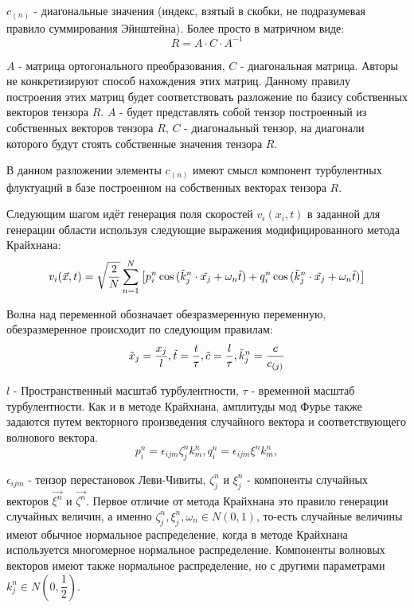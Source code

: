 $c_{\left( n \right)}$ - диагональные значения (индекс, взятый в скобки, не подразумевая правило суммирования Эйнштейна). Более просто в матричном виде:
\begin{equation}
  \label{eq:spectral_equation5}
    R = A \cdot C \cdot A ^ {-1}
\end{equation}

$A$ - матрица ортогонального преобразования, $C$ - диагональная матрица. Авторы не конкретизируют способ нахождения этих матриц. Данному правилу построения этих матриц будет соответствовать разложение по базису собственных векторов тензора $R$. $A$ - будет представлять собой тензор построенный из собственных векторов тензора $R$, $C$ - диагональный тензор, на диагонали которого будут стоять собственные значения тензора $R$. 

В данном разложении элементы $c_{\left( n \right)}$ имеют смысл компонент турбулентных флуктуаций в базе построенном на собственных векторах тензора $R$.

Следующим шагом идёт генерация поля скоростей $v_i(x_i, t)$ в заданной для генерации области используя следующие выражения модифицированного метода Крайхнана:
\begin{equation}
  \label{eq:spectral_equation6}
    v_i(\vec x, t) = \sqrt{\frac{2}{N}} \sum_{n = 1}^{N} \left[ p_i^n \cos{(\Tilde{k}_j^n \cdot \Tilde{x_j} + \omega_n \Tilde{t})} + q_i^n \cos{(\Tilde{k}_j^n \cdot \Tilde{x_j} + \omega_n \Tilde{t})} \right]
\end{equation}

Волна над переменной обозначает обезразмеренную переменную, обезразмеренное происходит по следующим правилам:
\begin{equation}
  \label{eq:spectral_equation7}
    \Tilde{x}_j = \frac{x_j}{l}, \Tilde{t} = \frac{t}{\tau}, \Tilde{c} = \frac{l}{\tau}, \Tilde{k}_j^n = \frac{c}{c_{(j)}}
\end{equation}

$l$ - Пространственный масштаб турбулентности, $\tau$ - временной масштаб турбулентности.
Как и в методе Крайхнана, амплитуды мод Фурье также задаются путем векторного произведения случайного вектора и соответствующего волнового вектора.
\begin{equation}
    \label{eq:spectral_equation8}
    p_i^n = \epsilon_{ijm} \zeta_j^n k_m^n, q_i^n = \epsilon_{ijm} \xi^n k_m^n,
\end{equation}

$\epsilon_{ijm}$ - тензор перестановок Леви-Чивиты, $\zeta_j^n$ и $\xi_j^n$ - компоненты случайных векторов $\vec{\xi^n}$ и $\vec{ \zeta^n}$. Первое отличие от метода Крайхнана это правило генерации случайных величин, а именно $\zeta_j^n, \xi^n_j, \omega_n \in N(0, 1)$, то-есть случайные величины имеют обычное нормальное распределение, когда в методе Крайхнана используется многомерное нормальное распределение. Компоненты волновых векторов имеют также нормальное распределение, но с другими параметрами $k_j^n \in N(0, \dfrac{1}{2})$.

